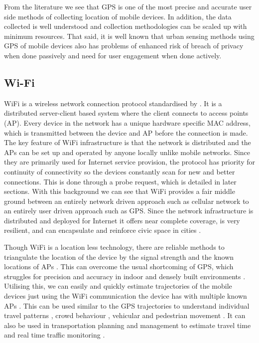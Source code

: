 From the literature we see that GPS is one of the most precise and accurate user side methods of collecting location of mobile devices.
In addition, the data collected is well understood and collection methodologies can be scaled up with minimum resources.
That said, it is well known that urban sensing methods using GPS of mobile devices also has problems of enhanced risk of breach of privacy when done passively and need for user engagement when done actively.

\subsection{Wi-Fi}

WiFi is a wireless network connection protocol standardised by \citet{ieee2016}.
It is a distributed server-client based system where the client connects to access points (AP).
Every device in the network has a unique hardware specific MAC address, which is transmitted between the device and AP before the connection is made.
The key feature of WiFi infrastructure is that the network is distributed and the APs can be set up and operated by anyone locally unlike mobile networks.
Since they are primarily used for Internet service provision, the protocol has priority for continuity of connectivity so the devices constantly scan for new and better connections.
This is done through a probe request, which is detailed in later sections.
With this background we can see that WiFi provides a fair middle ground between an entirely network driven approach such as cellular network to an entirely user driven approach such as GPS.
Since the network infrastructure is distributed and deployed for Internet it offers near complete coverage, is very resilient,  and can encapsulate and reinforce civic space in cities \cite{torrens2008}.

Though WiFi is a location less technology, there are reliable methods to triangulate the location of the device by the signal strength and the known locations of APs \citep{he2003, moore2004, lamarca2005}.
This can overcome the usual shortcoming of GPS, which struggles for precision and accuracy in indoor and densely built environments \citep{zarim2006, kawaguchi2009, xi2010}.
Utilising this, we can easily and quickly estimate trajectories of the mobile devices just using the WiFi communication the device has with multiple known APs \citep{xu2013}.
This can be used similar to the GPS trajectories to understand individual travel patterns \citep{kim2006, rekimoto2007, sap2015}, crowd behaviour \citep{abedi2013, mowafi2013}, vehicular \citep{lu2010} and pedestrian movement \citep{xu2013, fukuzaki2014, wang2016}.
It can also be used in transportation planning and management to estimate travel time \citep{musa2011} and real time traffic monitoring \citep{abbott-jard2013}.

